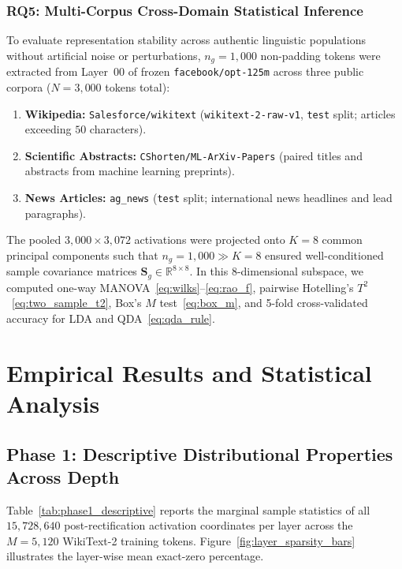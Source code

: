\documentclass[12pt, a4paper, oneside]{report}
\theoremstyle{definition}
\newcommand{\mat}[1]{\mathbf{#1}}
\newcommand{\R}{\mathbb{R}}
\begin{document}
\subsection{RQ5: Multi-Corpus Cross-Domain Statistical Inference}

To evaluate representation stability across authentic linguistic populations without artificial noise or perturbations, $n_g = 1{,}000$ non-padding tokens were extracted from Layer~00 of frozen \texttt{facebook/opt-125m} across three public corpora ($N = 3{,}000$ tokens total):
\begin{enumerate}
    \item \textbf{Wikipedia:} \texttt{Salesforce/wikitext} (\texttt{wikitext-2-raw-v1}, \texttt{test} split; articles exceeding $50$ characters).
    \item \textbf{Scientific Abstracts:} \texttt{CShorten/ML-ArXiv-Papers} (paired titles and abstracts from machine learning preprints).
    \item \textbf{News Articles:} \texttt{ag\_news} (\texttt{test} split; international news headlines and lead paragraphs).
    \end{enumerate}
The pooled $3{,}000 \times 3{,}072$ activations were projected onto $K = 8$ common principal components such that $n_g = 1{,}000 \gg K = 8$ ensured well-conditioned sample covariance matrices $\mat{S}_g \in \R^{8 \times 8}$. In this $8$-dimensional subspace, we computed one-way MANOVA~\eqref{eq:wilks}--\eqref{eq:rao_f}, pairwise Hotelling's $T^2$~\eqref{eq:two_sample_t2}, Box's $M$ test~\eqref{eq:box_m}, and 5-fold cross-validated accuracy for LDA and QDA~\eqref{eq:qda_rule}.

\chapter{Empirical Results and Statistical Analysis}

\section{Phase 1: Descriptive Distributional Properties Across Depth}

Table~\ref{tab:phase1_descriptive} reports the marginal sample statistics of all $15{,}728{,}640$ post-rectification activation coordinates per layer across the $M = 5{,}120$ WikiText-2 training tokens. Figure~\ref{fig:layer_sparsity_bars} illustrates the layer-wise mean exact-zero percentage.
\end{document}
